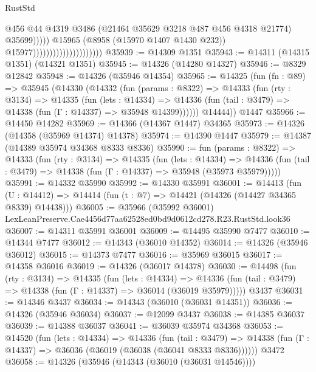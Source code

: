 \begin{lexlean}{RustStd}
\begin{coremodule}
                                                        @456
                                                        @44
                                                        @4319
                                                        @3486
                                                        (@21464 @35629 @3218 @487 @456 @4318 @21774)
                                                        @35699)))))
                                              @15965
                                              (@8958 (@15970 @1407 @1430 @232))
                                              @15977)))))))))))))))))))))
@35939 := @14309 @1351
@35943 := @14311 (@14315 @1351) (@14321 @1351)
@35945 := @14326 (@14280 @14327)
@35946 := @8329 @12842
@35948 := @14326 (@35946 @14354)
@35965 := @14325
    (fun (fn : @89) =>
    @35945
      (@14330
        (@14332
          (fun (params : @8322) =>
          @14333
            (fun (rty : @3134) =>
            @14335
              (fun (lets : @14334) =>
              @14336 (fun (tail : @3479) => @14338 (fun (Γ : @14337) => @35948 @14399))))))
        @14444))
    @1447
@35966 := @14450 @14282
@35969 := @14366 (@14367 @1447) @34365
@35973 := @14326 (@14358 (@35969 @14374) @14378)
@35974 := @14390 @1447
@35979 := @14387 (@14389 @35974 @34368 @8333 @8336)
@35990 := fun (params : @8322) =>
  @14333
    (fun (rty : @3134) =>
    @14335
      (fun (lets : @14334) =>
      @14336 (fun (tail : @3479) => @14338 (fun (Γ : @14337) => @35948 (@35973 @35979)))))
@35991 := @14332 @35990
@35992 := @14330 @35991
@36001 := @14413
    (fun (U : @14412) => @14414 (fun (t : @7) => @14421 (@14326 (@14427 @34365 @8339) @14438)))
@36005 := @35966
    (@35992 @36001)
    LexLeanPreserve.Cae4456d77aa62528ed0bd9d0612cd278.R23.RustStd.look36
@36007 := @14311 @35991 @36001
@36009 := @14495 @35990 @7477
@36010 := @14344 @7477
@36012 := @14343 (@36010 @14352)
@36014 := @14326 (@35946 @36012)
@36015 := @14373 @7477
@36016 := @35969 @36015
@36017 := @14358 @36016
@36019 := @14326 (@36017 @14378)
@36030 := @14498
    (fun (rty : @3134) =>
    @14335
      (fun (lets : @14334) =>
      @14336 (fun (tail : @3479) => @14338 (fun (Γ : @14337) => @36014 (@36019 @35979)))))
    @3437
@36031 := @14346 @3437
@36034 := @14343 (@36010 (@36031 @14351))
@36036 := @14326 (@35946 @36034)
@36037 := @12099 @3437
@36038 := @14385 @36037
@36039 := @14388 @36037
@36041 := @36039 @35974 @34368
@36053 := @14520
    (fun (lets : @14334) =>
    @14336
      (fun (tail : @3479) =>
      @14338 (fun (Γ : @14337) => @36036 (@36019 (@36038 (@36041 @8333 @8336))))))
    @3472
@36058 := @14326 (@35946 (@14343 (@36010 (@36031 @14546))))

\end{coremodule}
\end{lexlean}
